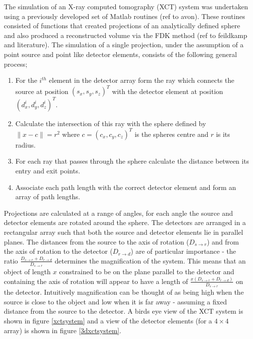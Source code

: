 \documentclass[
  twoside,
  11pt, a4paper,
  footinclude=true,
  headinclude=true,
  cleardoublepage=empty
]{scrbook}
\begin{document}
The simulation of an X-ray computed tomography (XCT) system was undertaken using a previously developed set of Matlab routines (ref to avon). These routines consisted of functions that created projections of an analytically defined sphere and also produced a reconstructed volume via the FDK method (ref to feildkamp and literature). The simulation of a single projection, under the assumption of a point source and point like detector elements, consists of the following general process;

\begin{enumerate}
\item For the $i^{th}$ element in the detector array form the ray which connects the source at position $(s_x,s_y,s_z)^T$ with the detector element at position $(d_x^i,d_y^i,d_z^i)^T$.
\item Calculate the intersection of this ray with the sphere defined by $\|x - c\| = r^2$ where $c = (c_x,c_y,c_z)^T$ is the spheres centre and $r$ is its radius.
\item For each ray that passes through the sphere calculate the distance between its entry and exit points.
\item Associate each path length with the correct detector element and form an array of path lengths.
\end{enumerate}

Projections are calculated at a range of angles, for each angle the source and detector elements are rotated around the sphere. The detectors are arranged in a rectangular array such that both the source and detector elements lie in parallel planes. The distances from the source to the axis of rotation ($D_{s\rightarrow r}$) and from the axis of rotation to the detector ($D_{r \rightarrow d}$) are of particular importance - the ratio $\frac{D_{s\rightarrow r}+D_{r \rightarrow d}}{D_{s\rightarrow r}}$ determines the magnification of the system. This means that an object of length $x$ constrained to be on the plane parallel to the detector and containing the axis of rotation will appear to have a length of $\frac{x(D_{s\rightarrow r}+D_{r \rightarrow d})}{D_{s\rightarrow r}}$ on the detector. Intuitively magnification can be thought of as being high when the source is close to the object and low when it is far away - assuming a fixed distance from the source to the detector. A birds eye view of the XCT system is shown in figure \ref{xctsystem} and a view of the detector elements (for a $4\times4$ array) is shown in figure \ref{3dxctsystem}.
\end{document}
